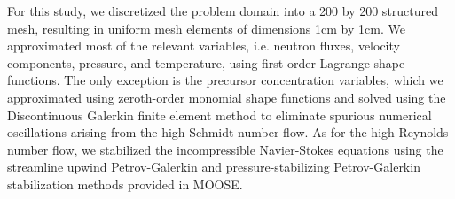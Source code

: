 For this study, we discretized the problem domain into a 200 by 200 structured
mesh, resulting in uniform mesh elements of dimensions 1cm by 1cm. We
approximated most of the relevant variables, i.e. neutron fluxes, velocity
components, pressure, and temperature, using first-order Lagrange shape
functions. The only exception is the precursor concentration variables, which
we approximated using zeroth-order monomial shape functions and solved using
the Discontinuous Galerkin finite element method to eliminate spurious
numerical oscillations arising from the high Schmidt number flow. As for the
high Reynolds number flow, we stabilized the incompressible Navier-Stokes
equations using the streamline upwind Petrov-Galerkin and pressure-stabilizing
Petrov-Galerkin stabilization methods \cite{peterson_overview_2017} provided in
\gls{MOOSE}.